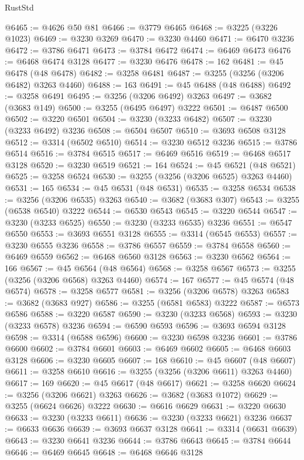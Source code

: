 \begin{lexlean}{RustStd}
\begin{coremodule}
@6465 := @4626 @50 @81
@6466 := @3779 @6465
@6468 := @3225 (@3226 @1023)
@6469 := @3230 @3269
@6470 := @3230 @4460
@6471 := @6470 @3236
@6472 := @3786 @6471
@6473 := @3784 @6472
@6474 := @6469 @6473
@6476 := @6468 @6474 @3128
@6477 := @3230 @6476
@6478 := 162
@6481 := @45 @6478 (@48 @6478)
@6482 := @3258 @6481
@6487 := @3255 (@3256 (@3206 @6482) @3263 @4460)
@6488 := 163
@6491 := @45 @6488 (@48 @6488)
@6492 := @3258 @6491
@6495 := @3256 (@3206 @6492) @3263
@6497 := @3682 (@3683 @149)
@6500 := @3255 (@6495 @6497) @3222
@6501 := @6487 @6500
@6502 := @3220 @6501
@6504 := @3230 (@3233 @6482)
@6507 := @3230 (@3233 @6492) @3236
@6508 := @6504 @6507
@6510 := @3693 @6508 @3128
@6512 := @3314 (@6502 @6510)
@6514 := @3230 @6512 @3236
@6515 := @3786 @6514
@6516 := @3784 @6515
@6517 := @6469 @6516
@6519 := @6468 @6517 @3128
@6520 := @3230 @6519
@6521 := 164
@6524 := @45 @6521 (@48 @6521)
@6525 := @3258 @6524
@6530 := @3255 (@3256 (@3206 @6525) @3263 @4460)
@6531 := 165
@6534 := @45 @6531 (@48 @6531)
@6535 := @3258 @6534
@6538 := @3256 (@3206 @6535) @3263
@6540 := @3682 (@3683 @307)
@6543 := @3255 (@6538 @6540) @3222
@6544 := @6530 @6543
@6545 := @3220 @6544
@6547 := @3230 (@3233 @6525)
@6550 := @3230 (@3233 @6535) @3236
@6551 := @6547 @6550
@6553 := @3693 @6551 @3128
@6555 := @3314 (@6545 @6553)
@6557 := @3230 @6555 @3236
@6558 := @3786 @6557
@6559 := @3784 @6558
@6560 := @6469 @6559
@6562 := @6468 @6560 @3128
@6563 := @3230 @6562
@6564 := 166
@6567 := @45 @6564 (@48 @6564)
@6568 := @3258 @6567
@6573 := @3255 (@3256 (@3206 @6568) @3263 @4460)
@6574 := 167
@6577 := @45 @6574 (@48 @6574)
@6578 := @3258 @6577
@6581 := @3256 (@3206 @6578) @3263
@6583 := @3682 (@3683 @927)
@6586 := @3255 (@6581 @6583) @3222
@6587 := @6573 @6586
@6588 := @3220 @6587
@6590 := @3230 (@3233 @6568)
@6593 := @3230 (@3233 @6578) @3236
@6594 := @6590 @6593
@6596 := @3693 @6594 @3128
@6598 := @3314 (@6588 @6596)
@6600 := @3230 @6598 @3236
@6601 := @3786 @6600
@6602 := @3784 @6601
@6603 := @6469 @6602
@6605 := @6468 @6603 @3128
@6606 := @3230 @6605
@6607 := 168
@6610 := @45 @6607 (@48 @6607)
@6611 := @3258 @6610
@6616 := @3255 (@3256 (@3206 @6611) @3263 @4460)
@6617 := 169
@6620 := @45 @6617 (@48 @6617)
@6621 := @3258 @6620
@6624 := @3256 (@3206 @6621) @3263
@6626 := @3682 (@3683 @1072)
@6629 := @3255 (@6624 @6626) @3222
@6630 := @6616 @6629
@6631 := @3220 @6630
@6633 := @3230 (@3233 @6611)
@6636 := @3230 (@3233 @6621) @3236
@6637 := @6633 @6636
@6639 := @3693 @6637 @3128
@6641 := @3314 (@6631 @6639)
@6643 := @3230 @6641 @3236
@6644 := @3786 @6643
@6645 := @3784 @6644
@6646 := @6469 @6645
@6648 := @6468 @6646 @3128

\end{coremodule}
\end{lexlean}
